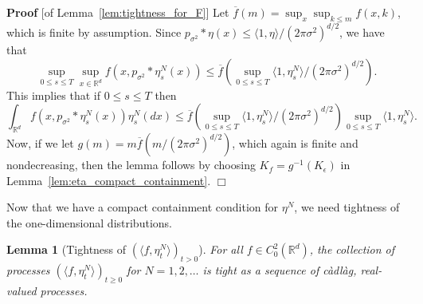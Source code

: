 \documentclass[12pt]{article}
\newenvironment {proof}{{\noindent\bf Proof }}{\hfill $\Box$ \medskip}
\newtheorem{lemma}[theorem]{Lemma}
\def \bar{\overline}
\newcommand{\IR}{\mathbb R}
\begin{document}
\begin{proof}[of Lemma~\ref{lem:tightness_for_F}]
    Let $\bar f(m) = \sup_x \sup_{k \le m} f(x, k)$, which is finite by assumption.
    Since $p_{\sigma^2}*\eta(x) \le \langle 1, \eta \rangle / (2 \pi \sigma^2)^{d/2}$,
    we have that
    $$
        \sup_{0 \le s \le T} \sup_{x \in \IR^d} f(x, p_{\sigma^2}*\eta^N_s(x))
        \le
        \bar f( \sup_{0 \le s \le T} \langle 1, \eta^N_s \rangle  / (2 \pi \sigma^2)^{d/2} ) .
    $$
    This implies that if $0 \le s \le T$ then
    $$
            \int_{\IR^d} f(x, p_{\sigma^2}*\eta^N_s(x)) \eta^N_s(dx)
            \le
            \bar f(\sup_{0 \le s \le T} \langle 1, \eta^N_s \rangle  / (2 \pi \sigma^2)^{d/2} )
            \sup_{0 \le s \le T} \langle 1, \eta^N_s \rangle .
    $$
    Now, if we let $g(m) = m \bar f(m/ (2 \pi \sigma^2)^{d/2})$,
    which again is finite and nondecreasing,
    then the lemma follows by choosing $K_f = g^{-1}(K_\epsilon)$
    in Lemma~\ref{lem:eta_compact_containment}.
\end{proof}

Now that we have a compact containment condition for $\eta^N$,
we need tightness of the one-dimensional distributions.

\begin{lemma}[Tightness of $(\langle f, \eta^{N}_t \rangle )_{t>0}$]
    \label{lem:eta_projections_tightness}
For all $f \in C^{2}_{0}(\IR^d)$, 
the collection of processes
$(\langle f, \eta^{N}_t \rangle)_{t \geq 0}$
for $N = 1, 2, \ldots$ is tight as a sequence of c\`adl\`ag, real-valued processes.
\end{lemma}
\end{document}
